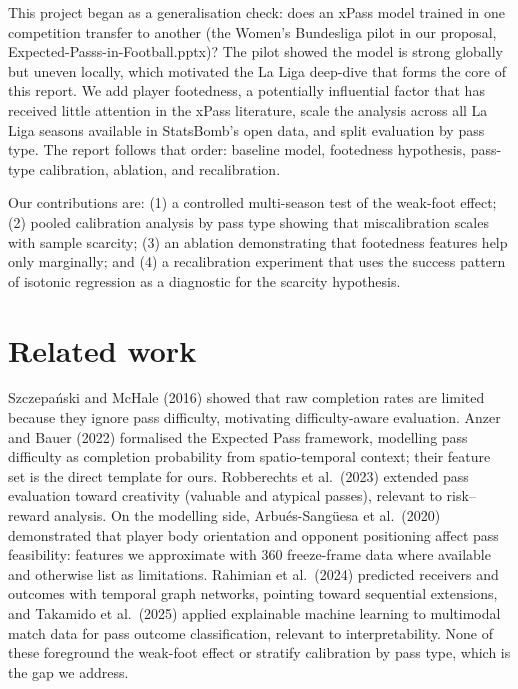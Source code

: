 \documentclass[11pt,a4paper]{article}
\begin{document}
This project began as a generalisation check: does an xPass model trained
in one competition transfer to another (the Women's Bundesliga pilot in
our proposal, Expected-Passs-in-Football.pptx)? The pilot
showed the model is strong globally but uneven locally, which motivated
the La Liga deep-dive that forms the core of this report. We add player
footedness, a potentially influential factor that has received little
attention in the xPass literature, scale the analysis across all La
Liga seasons available in StatsBomb's open data, and split evaluation by
pass type. The report follows that order: baseline model, footedness
hypothesis, pass-type calibration, ablation, and recalibration.

Our contributions are: (1) a controlled multi-season test of the
weak-foot effect; (2) pooled calibration analysis by pass type showing
that miscalibration scales with sample scarcity; (3) an ablation
demonstrating that footedness features help only marginally; and
(4) a recalibration experiment that uses the success pattern of isotonic
regression as a diagnostic for the scarcity hypothesis.

\section{Related work}
Szczepa\'nski and McHale (2016) showed that raw completion rates are
limited because they ignore pass difficulty, motivating difficulty-aware
evaluation. Anzer and Bauer (2022) formalised the Expected Pass framework,
modelling pass difficulty as completion probability from spatio-temporal
context; their feature set is the direct template for ours. Robberechts et
al.\ (2023) extended pass evaluation toward creativity (valuable and
atypical passes), relevant to risk--reward analysis. On the modelling
side, Arbu\'es-Sang\"uesa et al.\ (2020) demonstrated that player body
orientation and opponent positioning affect pass feasibility: features
we approximate with 360 freeze-frame data where available and otherwise
list as limitations. Rahimian et al.\ (2024) predicted receivers and
outcomes with temporal graph networks, pointing toward sequential
extensions, and Takamido et al.\ (2025) applied explainable machine
learning to multimodal match data for pass outcome classification,
relevant to interpretability. None of these foreground the weak-foot
effect or stratify calibration by pass type, which is the gap we address.
\end{document}
